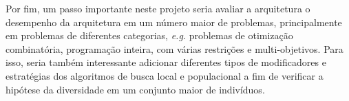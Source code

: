 Por fim, um passo importante neste projeto seria avaliar a arquitetura o desempenho da arquitetura em um número maior de problemas, principalmente em problemas de diferentes categorias, \textit{e.g.} problemas de otimização combinatória, programação inteira, com várias restrições e multi-objetivos. Para isso, seria também interessante adicionar diferentes tipos de modificadores e estratégias dos algoritmos de busca local e populacional a fim de verificar a hipótese da diversidade em um conjunto maior de indivíduos. 
